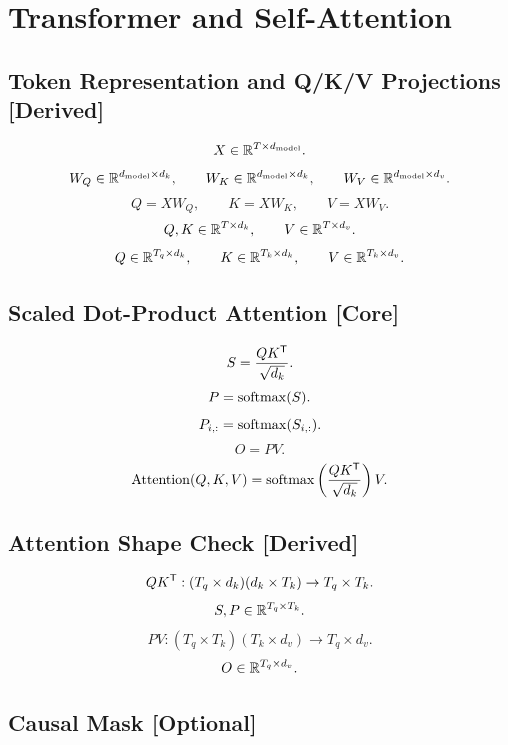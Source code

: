 \section{Transformer and Self-Attention}

\subsection{Token Representation and Q/K/V Projections \textbf{[Derived]}}

\[
X \in \mathbb{R}^{T \times d_{\mathrm{model}}}.
\]
\[
W_Q \in \mathbb{R}^{d_{\mathrm{model}} \times d_k},
\qquad
W_K \in \mathbb{R}^{d_{\mathrm{model}} \times d_k},
\qquad
W_V \in \mathbb{R}^{d_{\mathrm{model}} \times d_v}.
\]
\[
Q = XW_Q,
\qquad
K = XW_K,
\qquad
V = XW_V.
\]
\[
Q,K \in \mathbb{R}^{T \times d_k},
\qquad
V \in \mathbb{R}^{T \times d_v}.
\]
\[
Q \in \mathbb{R}^{T_q \times d_k},
\qquad
K \in \mathbb{R}^{T_k \times d_k},
\qquad
V \in \mathbb{R}^{T_k \times d_v}.
\]

\subsection{Scaled Dot-Product Attention \textbf{[Core]}}

\[
S
=
\frac{QK^{\mathsf{T}}}{\sqrt{d_k}}.
\]
\[
P
=
\operatorname{softmax}(S).
\]
\[
P_{i,:}=\operatorname{softmax}(S_{i,:}).
\]
\[
O
=
PV.
\]
\[
\operatorname{Attention}(Q,K,V)
=
\operatorname{softmax}
\left(
\frac{QK^{\mathsf{T}}}{\sqrt{d_k}}
\right)
V.
\]

\subsection{Attention Shape Check \textbf{[Derived]}}

\[
QK^{\mathsf{T}}:
(T_q \times d_k)(d_k \times T_k)
\to
T_q \times T_k.
\]
\[
S,P \in \mathbb{R}^{T_q \times T_k}.
\]
\[
PV:
(T_q \times T_k)(T_k \times d_v)
\to
T_q \times d_v.
\]
\[
O \in \mathbb{R}^{T_q \times d_v}.
\]

\subsection{Causal Mask \textbf{[Optional]}}

